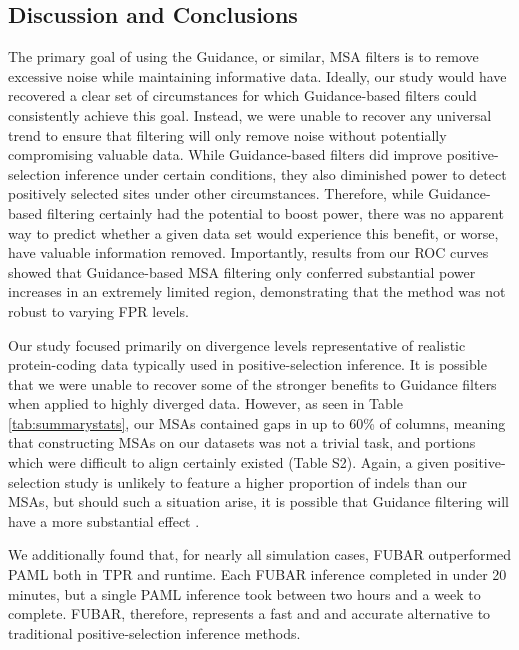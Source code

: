 \documentclass[11pt]{article}
\begin{document}
\subsection*{Discussion and Conclusions}

The primary goal of using the Guidance, or similar, MSA filters is to remove excessive noise while maintaining informative data. Ideally, our study would have recovered a clear set of circumstances for which Guidance-based filters could consistently achieve this goal. Instead, we were unable to recover any universal trend to ensure that filtering will only remove noise without potentially compromising valuable data. While Guidance-based filters did improve positive-selection inference under certain conditions, they also diminished power to detect positively selected sites under other circumstances. Therefore, while Guidance-based filtering certainly had the potential to boost power, there was no apparent way to predict whether a given data set would experience this benefit, or worse, have valuable information removed.  Importantly, results from our ROC curves showed that Guidance-based MSA filtering only conferred substantial power increases in an extremely limited region, demonstrating that the method was not robust to varying FPR levels.

Our study focused primarily on divergence levels representative of realistic protein-coding data typically used in positive-selection inference. It is possible that we were unable to recover some of the stronger benefits to Guidance filters when applied to highly diverged data. However, as seen in Table \ref{tab:summarystats}, our MSAs contained gaps in up to 60\% of columns, meaning that constructing MSAs on our datasets was not a trivial task, and portions which were difficult to align certainly existed (Table S2). Again, a given positive-selection study is unlikely to feature a higher proportion of indels than our MSAs, but should such a situation arise, it is possible that Guidance filtering will have a more substantial effect \citep{Privman2012}.

We additionally found that, for nearly all simulation cases, FUBAR outperformed PAML both in TPR and runtime. Each FUBAR inference completed in under 20 minutes, but a single PAML inference took between two hours and a week to complete. FUBAR, therefore, represents a fast and and accurate alternative to traditional positive-selection inference methods.

\end{document}
